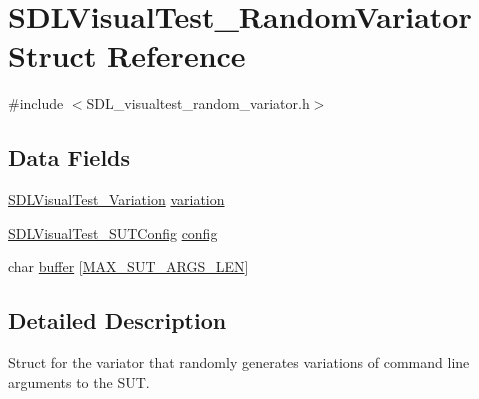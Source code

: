 \hypertarget{struct_s_d_l_visual_test___random_variator}{\section{S\-D\-L\-Visual\-Test\-\_\-\-Random\-Variator Struct Reference}
\label{struct_s_d_l_visual_test___random_variator}
}


{\ttfamily \#include $<$S\-D\-L\-\_\-visualtest\-\_\-random\-\_\-variator.\-h$>$}

\subsection*{Data Fields}
\begin{DoxyCompactItemize}
\item 
\hyperlink{struct_s_d_l_visual_test___variation}{S\-D\-L\-Visual\-Test\-\_\-\-Variation} \hyperlink{struct_s_d_l_visual_test___random_variator_a11c2995cf19b41c4a1b1f8d9b4081ff7}{variation}
\item 
\hyperlink{struct_s_d_l_visual_test___s_u_t_config}{S\-D\-L\-Visual\-Test\-\_\-\-S\-U\-T\-Config} \hyperlink{struct_s_d_l_visual_test___random_variator_ab66b4220589b2e2b6e1fde7d6c20bd72}{config}
\item 
char \hyperlink{struct_s_d_l_visual_test___random_variator_a2b599af5b00be0f525ffc18feb0775a8}{buffer} \mbox{[}\hyperlink{_s_d_l__visualtest__harness__argparser_8h_a8485cbda108eca56406d67aaa685fcc5}{M\-A\-X\-\_\-\-S\-U\-T\-\_\-\-A\-R\-G\-S\-\_\-\-L\-E\-N}\mbox{]}
\end{DoxyCompactItemize}


\subsection{Detailed Description}
Struct for the variator that randomly generates variations of command line arguments to the S\-U\-T. 

